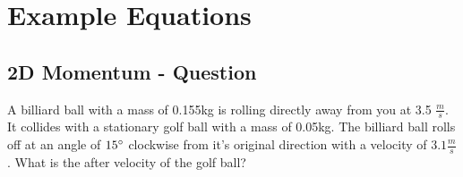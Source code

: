 \documentclass{article}
\begin{document}
\section{Example Equations}
\begin{adjustwidth}{1cm}{0pt}
    \subsection*{2D Momentum - Question}
    \begin{adjustwidth}{1cm}{0pt}
        A billiard ball with a mass of 0.155kg is rolling directly
        away from you at 3.5 $\frac{m}{s}$. It collides with a stationary golf ball with
        a mass of 0.05kg. The billiard ball rolls off at an angle of $15\degree$ clockwise
        from it's original direction with a velocity of $3.1\frac{m}{s}$. What is the after
        velocity of the golf ball?
    \end{adjustwidth}

\end{adjustwidth}
\end{document}
